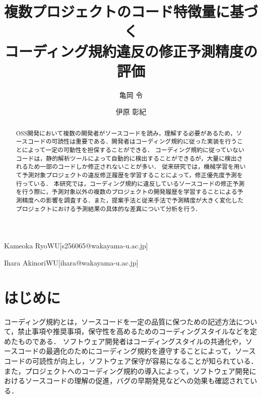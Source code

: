 \documentclass[submit,noauthor,ses,dvipdfmx]{ipsj}
\begin{document}
\title{複数プロジェクトのコード特徴量に基づく\\コーディング規約違反の修正予測精度の評価}




\author{亀岡  令}{Kameoka Ryo}{WU}[s256065@wakayama-u.ac.jp]
\author{伊原  彰紀}{Ihara Akinori}{WU}[ihara@wakayama-u.ac.jp]

\begin{abstract}
OSS開発において複数の開発者がソースコードを読み，理解する必要があるため，ソースコードの可読性は重要である．開発者はコーディング規約に従った実装を行うことによって一定の可動性を担保することができる．
コーディング規約に従っていないコードは，静的解析ツールによって自動的に検出することができるが，大量に検出されるため一部のコードしか修正されないことが多い．
従来研究では，機械学習を用いて予測対象プロジェクトの違反修正履歴を学習することによって，修正優先度予測を行っている．
本研究では，コーディング規約に違反しているソースコードの修正予測を行う際に，予測対象以外の複数のプロジェクトの開発履歴を学習することによる予測精度への影響を調査する．また，提案手法と従来手法で予測精度が大きく変化したプロジェクトにおける予測結果の具体的な差異について分析を行う．


\end{abstract}

\maketitle

\section{はじめに}

コーディング規約とは，ソースコードを一定の品質に保つための記述方法について，禁止事項や推奨事項，保守性を高めるためのコーディングスタイルなどを定めたものである．
ソフトウェア開発者はコーディングスタイルの共通化や，ソースコードの最適化のためにコーディング規約を遵守することによって，ソースコードの可読性が向上し，ソフトウェア保守が容易になることが知られている\cite{EffectsSAT}．また，プロジェクトへのコーディング規約の導入によって，ソフトウェア開発におけるソースコードの理解の促進，バグの早期発見などへの効果も確認されている\cite{Beller2}\cite{Johnson}\cite{Beller}．
\end{document}
